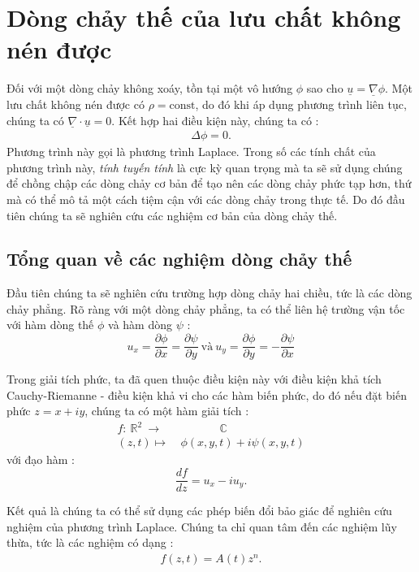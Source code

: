 \documentclass[CO_LUU_CHAT.tex]{subfiles}
\begin{document}
\section{Dòng chảy thế của lưu chất không nén được}
Đối với một dòng chảy không xoáy, tồn tại một vô hướng $\phi$ sao cho $\underline{u}=\underline{\nabla}\phi$. Một lưu chất không nén được có $\rho=\text{const}$, do đó khi áp dụng phương trình liên tục, chúng ta có $\underline{\nabla}\cdot\underline{u}=0$. Kết hợp hai điều kiện này, chúng ta có :
\begin{equation}
	\begin{aligned}
		\boxed{
			\Delta\phi=0
		}.
	\end{aligned}
\end{equation}
Phương trình này gọi là phương trình Laplace. Trong số các tính chất của phương trình này, \emph{tính tuyến tính} là cực kỳ quan trọng mà ta sẽ sử dụng chúng để chồng chập các dòng chảy cơ bản để tạo nên các dòng chảy phức tạp hơn, thứ mà có thể mô tả một cách tiệm cận với các dòng chảy trong thực tế. Do đó đầu tiên chúng ta sẽ nghiên cứu các nghiệm cơ bản của dòng chảy thế.
\subsection{Tổng quan về các nghiệm dòng chảy thế}
Đầu tiên chúng ta sẽ nghiên cứu trường hợp dòng chảy hai chiều, tức là các dòng chảy phẳng. Rõ ràng với một dòng chảy phẳng, ta có thể liên hệ trường vận tốc với hàm dòng thế $\phi$ và hàm dòng $\psi$ :
$$
u_x=\frac{\partial\phi}{\partial x}=\frac{\partial\psi}{\partial y}\ \text{và}\ 
u_y=\frac{\partial\phi}{\partial y}=-\frac{\partial\psi}{\partial x}
$$

Trong giải tích phức, ta đã quen thuộc điều kiện này với điều kiện khả tích Cauchy-Riemanne - điều kiện khả vi cho các hàm biến phức, do đó nếu đặt biến phức $z=x+iy$, chúng ta có một hàm giải tích :
$$
\begin{aligned}
	f\colon\ \mathbb{R}^2\ \longrightarrow&\qquad\quad\ \ \ \mathbb{C}\\
	(z,t)\longmapsto&\ \phi(x,y,t)+i\psi(x,y,t)
\end{aligned}
$$
với đạo hàm :
$$
\frac{df}{dz}=u_x-iu_y.
$$

Kết quả là chúng ta có thể sử dụng các phép biến đổi bảo giác để nghiên cứu nghiệm của phương trình Laplace. Chúng ta chỉ quan tâm đến các nghiệm lũy thừa, tức là các nghiệm có dạng :
\begin{equation}\label{eq:pow_law_conformal}
	\begin{aligned}
		\boxed{
			f(z,t)=A(t)z^n
		}.
	\end{aligned}
\end{equation}
\end{document}
